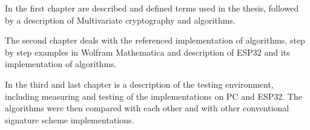 \documentclass[thesis=M,english]{FITthesis}[2019/12/23]
\begin{document}
\bigskip
\noindent
In the first chapter are described and defined terms used in the thesis, followed by a description of Multivariate cryptography and algorithms.

\bigskip
\noindent
The second chapter deals with the referenced implementation of algorithms, step by step examples in Wolfram Mathematica and description of ESP32 and its implementation of algorithms.

\bigskip
\noindent
In the third and last chapter is a description of the testing environment, including measuring and testing of the implementations on PC and ESP32. The algorithms were then compared with each other and with other conventional signature scheme implementations.



\end{document}

